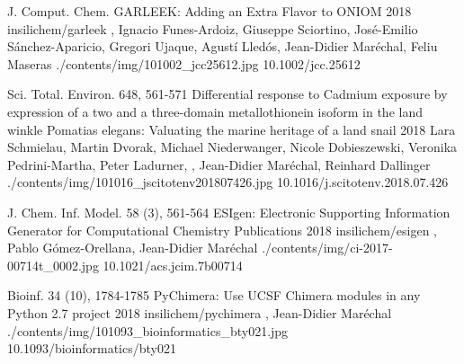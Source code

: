
\begin{cventries}

  \pubentry
    {J. Comput. Chem.} %
    {GARLEEK: Adding an Extra Flavor to ONIOM} %
    {2018} %
    {insilichem/garleek} %
    {, Ignacio Funes-Ardoiz, Giuseppe Sciortino, José-Emilio Sánchez-Aparicio, Gregori Ujaque, Agustí Lledós, Jean-Didier Maréchal, Feliu Maseras} %
    {./contents/img/101002_jcc25612.jpg} %
    {10.1002/jcc.25612} %

  \pubentry
    {Sci. Total. Environ. 648, 561-571} %
    {Differential response to Cadmium exposure by expression of a two and a three-domain metallothionein isoform in the land winkle Pomatias elegans: Valuating the marine heritage of a land snail} %
    {2018} %
    {} %
    {Lara Schmielau, Martin Dvorak, Michael Niederwanger, Nicole Dobieszewski, Veronika Pedrini-Martha, Peter Ladurner, , Jean-Didier Maréchal, Reinhard Dallinger} %
    {./contents/img/101016_jscitotenv201807426.jpg} %
    {10.1016/j.scitotenv.2018.07.426} %

  \pubentry
    {J. Chem. Inf. Model. 58 (3), 561-564} %
    {ESIgen: Electronic Supporting Information Generator for Computational Chemistry Publications} %
    {2018} %
    {insilichem/esigen} %
    {,\textsuperscript{\dagger} Pablo Gómez-Orellana, Jean-Didier Maréchal\textsuperscript{\dagger}} %
    {./contents/img/ci-2017-00714t_0002.jpg} %
    {10.1021/acs.jcim.7b00714} %

  \pubentry
    {Bioinf. 34 (10), 1784-1785} %
    {PyChimera: Use UCSF Chimera modules in any Python 2.7 project} %
    {2018} %
    {insilichem/pychimera} %
    {,\textsuperscript{\dagger} Jean-Didier Maréchal\textsuperscript{\dagger}} %
    {./contents/img/101093_bioinformatics_bty021.jpg} %
    {10.1093/bioinformatics/bty021} %


\end{cventries}
